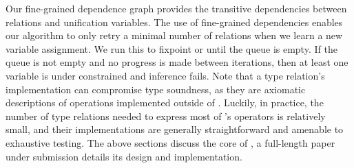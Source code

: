   Our fine-grained dependence graph provides the transitive dependencies
    between relations and unification variables.
  The use of fine-grained dependencies enables our algorithm to
    only retry a minimal number of relations when we
    learn a new variable assignment.
  We run this to fixpoint or until the queue is empty.
  If the queue is not empty and no progress is made between iterations,
    then at least one variable is under constrained and inference fails.
  Note that a type relation's implementation can
    compromise type soundness, as they are axiomatic descriptions
    of operations implemented outside of \relay.
  Luckily, in practice, the number of type relations needed to express most of \relay's
    operators is relatively small, and their implementations are generally straightforward
    and amenable to exhaustive testing.
The above sections discuss the core of \relay, a full-length paper under submission\cite{relay_arixv}
  details its design and implementation.
